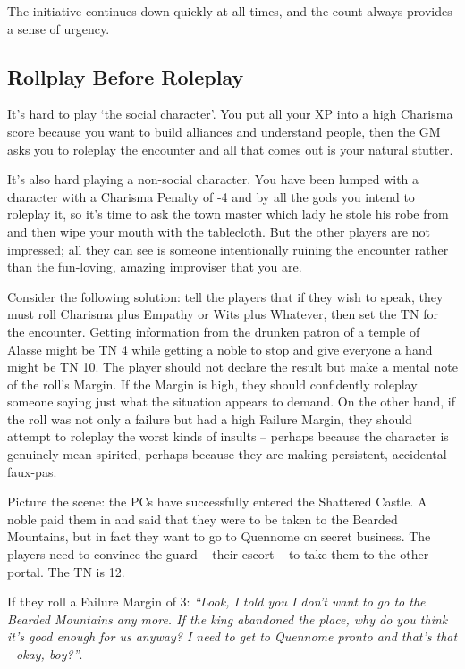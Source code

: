 The initiative continues down quickly at all times, and the count always provides a sense of urgency.

\subsection{Rollplay Before Roleplay}

It's hard to play `the social character'.  You put all your XP into a high Charisma score because you want to build alliances and understand people, then the GM asks you to roleplay the encounter and all that comes out is your natural stutter.

It's also hard playing a non-social character.  You have been lumped with a character with a Charisma Penalty of -4 and by all the gods you intend to roleplay it, so it's time to ask the town master which lady he stole his robe from and then wipe your mouth with the tablecloth.  But the other players are not impressed; all they can see is someone intentionally ruining the encounter rather than the fun-loving, amazing improviser that you are.

Consider the following solution: tell the players that if they wish to speak, they must roll Charisma plus Empathy or Wits plus Whatever, then set the TN for the encounter.  Getting information from the drunken patron of a temple of Alasse might be TN 4 while getting a noble to stop and give everyone a hand might be TN 10.  The player should not declare the result but make a mental note of the roll's Margin.  If the Margin is high, they should confidently roleplay someone saying just what the situation appears to demand.  On the other hand, if the roll was not only a failure but had a high Failure Margin, they should attempt to roleplay the worst kinds of insults -- perhaps because the character is genuinely mean-spirited, perhaps because they are making persistent, accidental faux-pas.

Picture the scene: the PCs have successfully entered the Shattered Castle.  A noble paid them in and said that they were to be taken to the Bearded Mountains, but in fact they want to go to Quennome on secret business.  The players need to convince the guard -- their escort -- to take them to the other portal.  The TN is 12.

If they roll a Failure Margin of 3: \textit{``Look, I told you I don't want to go to the Bearded Mountains any more.  If the king abandoned the place, why do you think it's good enough for us anyway?  I need to get to Quennome pronto and that's that - okay, boy?''}.

